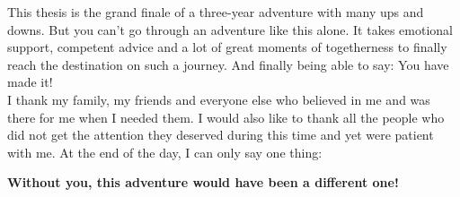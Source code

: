 This thesis is the grand finale of a three-year adventure with many ups and downs. But you can't go through an adventure like this alone. It takes emotional support, competent advice and a lot of great moments of togetherness to finally reach the destination on such a journey. And finally being able to say: You have made it!
\\

\noindent I thank my family, my friends and everyone else who believed in me and was there for me when I needed them. I would also like to thank all the people who did not get the attention they deserved during this time and yet were patient with me. At the end of the day, I can only say one thing:
\begin{center}
    \textbf{Without you, this adventure would have been a different one!}
\end{center}